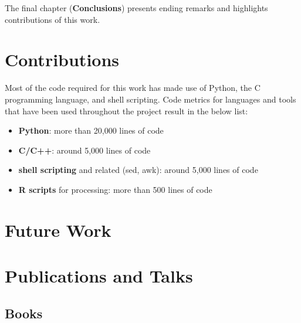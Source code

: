 The final chapter (\textbf{Conclusions}) presents ending remarks and
highlights contributions of this work.

\section{Contributions}
\label{sec:conclusion:contributions}


Most of the code required for this work has made use of Python, the C
programming language, and shell scripting. Code metrics for languages and
tools that have been used throughout the project result in the below list:

\begin{itemize}
  \item \textbf{Python}: more than 20,000 lines of code
  \item \textbf{C/C++}: around 5,000 lines of code
  \item \textbf{shell scripting} and related (sed, awk): around 5,000 lines
  of code
  \item \textbf{R scripts} for processing: more than 500 lines of code
\end{itemize}

\section{Future Work}
\label{sec:conclusion:future}


\section{Publications and Talks}
\label{sec:conclusion:publications}

\subsection{Books}

